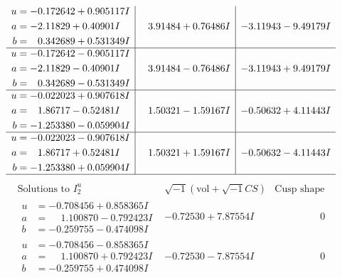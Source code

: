 \documentclass[1p]{elsarticle_modified}
\theoremstyle{definition}
\newcommand{\I}{\sqrt{-1}}
\begin{document}
$$\begin{array}{c|c|c}
\begin{aligned}
u &= -0.172642 + 0.905117 I \\
a &= -2.11829 + 0.40901 I \\
b &= \phantom{-}0.342689 + 0.531349 I\end{aligned}
 & \phantom{-}3.91484 + 0.76486 I & -3.11943 - 9.49179 I \\ \hline\begin{aligned}
u &= -0.172642 - 0.905117 I \\
a &= -2.11829 - 0.40901 I \\
b &= \phantom{-}0.342689 - 0.531349 I\end{aligned}
 & \phantom{-}3.91484 - 0.76486 I & -3.11943 + 9.49179 I \\ \hline\begin{aligned}
u &= -0.022023 + 0.907618 I \\
a &= \phantom{-}1.86717 - 0.52481 I \\
b &= -1.253380 - 0.059904 I\end{aligned}
 & \phantom{-}1.50321 - 1.59167 I & -0.50632 + 4.11443 I \\ \hline\begin{aligned}
u &= -0.022023 - 0.907618 I \\
a &= \phantom{-}1.86717 + 0.52481 I \\
b &= -1.253380 + 0.059904 I\end{aligned}
 & \phantom{-}1.50321 + 1.59167 I & -0.50632 - 4.11443 I\\
 \hline 
 \end{array}$$\newpage$$\begin{array}{c|c|c}  
\text{Solutions to }I^u_{2}& \I (\text{vol} + \sqrt{-1}CS) & \text{Cusp shape}\\
 \hline 
\begin{aligned}
u &= -0.708456 + 0.858365 I \\
a &= \phantom{-}1.100870 - 0.792423 I \\
b &= -0.259755 - 0.474098 I\end{aligned}
 & -0.72530 + 7.87554 I & \phantom{-0.000000 } 0 \\ \hline\begin{aligned}
u &= -0.708456 - 0.858365 I \\
a &= \phantom{-}1.100870 + 0.792423 I \\
b &= -0.259755 + 0.474098 I\end{aligned}
 & -0.72530 - 7.87554 I & \phantom{-0.000000 } 0 \\ \hline\begin{aligned}

\end{aligned}
\end{array}$$
\end{document}
